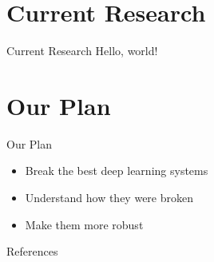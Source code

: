 \documentclass{beamer}
\begin{document}
\section{Current Research}

\begin{frame}{Current Research}
Hello, world! \cite{Finlayson_Chung_Kohane_Beam_2018}
\end{frame}


\section{Our Plan}

\begin{frame}{Our Plan}
\begin{itemize}
    \item Break the best deep learning systems
    \pause
    \item Understand how they were broken
    \pause
    \item Make them more robust
\end{itemize}
\end{frame}



\begin{frame}[allowframebreaks]{References}
    \printbibliography
\end{frame}
\end{document}
